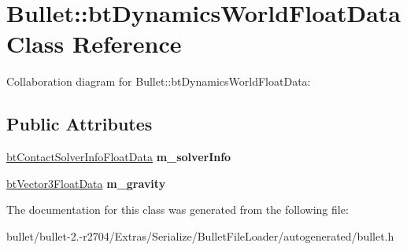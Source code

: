 \hypertarget{class_bullet_1_1bt_dynamics_world_float_data}{\section{Bullet\+:\+:bt\+Dynamics\+World\+Float\+Data Class Reference}
\label{class_bullet_1_1bt_dynamics_world_float_data}
}


Collaboration diagram for Bullet\+:\+:bt\+Dynamics\+World\+Float\+Data\+:
\subsection*{Public Attributes}
\begin{DoxyCompactItemize}
\item 
\hypertarget{class_bullet_1_1bt_dynamics_world_float_data_a06f0066b6224e8097865b2a7c9f1ac43}{\hyperlink{class_bullet_1_1bt_contact_solver_info_float_data}{bt\+Contact\+Solver\+Info\+Float\+Data} {\bfseries m\+\_\+solver\+Info}}\label{class_bullet_1_1bt_dynamics_world_float_data_a06f0066b6224e8097865b2a7c9f1ac43}

\item 
\hypertarget{class_bullet_1_1bt_dynamics_world_float_data_afe7d37294341f4ad1c7f666c03e524df}{\hyperlink{class_bullet_1_1bt_vector3_float_data}{bt\+Vector3\+Float\+Data} {\bfseries m\+\_\+gravity}}\label{class_bullet_1_1bt_dynamics_world_float_data_afe7d37294341f4ad1c7f666c03e524df}

\end{DoxyCompactItemize}


The documentation for this class was generated from the following file\+:\begin{DoxyCompactItemize}
\item 
bullet/bullet-\/2.-\/r2704/\+Extras/\+Serialize/\+Bullet\+File\+Loader/autogenerated/bullet.\+h\end{DoxyCompactItemize}
